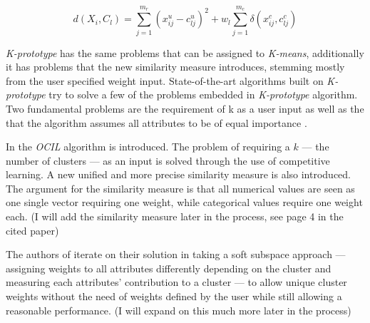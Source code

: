 \documentclass[a4paper,11pt]{article}
\begin{document}
\begin{equation}
\label{eq:1}
d(X_i, C_l) = \sum_{j=1}^{m_r}( x_{ij}^{u} - c_{lj}^{u} )^2 +
  w_l \sum_{j=1}^{m_c}\delta( x_{ij}^c, c_{lj}^c )
\end{equation}




\textit{K-prototype} has the same problems that can be assigned to \textit{K-means}, additionally it has problems that the new similarity measure introduces, stemming mostly from the user specified weight input. State-of-the-art algorithms built on \textit{K-prototype} try to solve a few of the problems embedded in \textit{K-prototype} algorithm. Two fundamental problems are the requirement of k as a user input as well as the that the algorithm assumes all attributes to be of equal importance \cite{Cheung2013}\cite{huang2005automated}.


In \cite{Cheung2013} the \textit{OCIL} algorithm is introduced. The problem of requiring a $k$ --- the number of clusters --- as an input is solved through the use of competitive learning. A new unified and more precise similarity measure is also introduced. The argument for the similarity measure is that all numerical values are seen as one single vector requiring one weight, while categorical values require one weight each. (I will add the similarity measure later in the process, see page 4 in the cited paper)

The authors of \cite{Cheung2013} iterate on their solution in \cite{Jia2018} taking a soft subspace approach --- assigning weights to all attributes differently depending on the cluster and measuring each attributes' contribution to a cluster \cite{Deng2016}  --- to allow unique cluster weights without the need of weights defined by the user while still allowing a reasonable performance. (I will expand on this much more later in the process)
\end{document}

